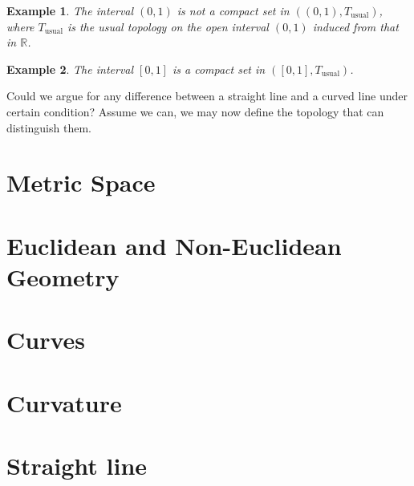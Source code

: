 \documentclass[12pt]{article}
\newtheorem*{example}{Example}
\begin{document}
    \begin{example}
        The interval $(0,1)$ is not a compact set in $((0,1),T_{\textrm{usual}})$, where $T_{\textrm{usual}}$ is the usual topology on the open interval $(0,1)$ induced from that in $\mathbb{R}$.
    \end{example}

    \begin{example}
        The interval $[0,1]$ is a compact set in $([0,1],T_{\textrm{usual}})$.
    \end{example}

    Could we argue for any difference between a straight line and a curved line under certain condition? Assume we can, we may now define the topology that can distinguish them.

    \section{Metric Space}

    \section{Euclidean and Non-Euclidean Geometry}

    \section{Curves}

    \section{Curvature}

    \section{Straight line}
    
\end{document}
